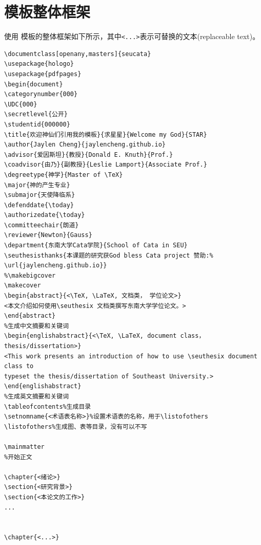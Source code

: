 \documentclass[openany,masters]{seucata}
\begin{document}
\section{模板整体框架}
使用 \seuthesix 模板的整体框架如下所示，其中\verb+<...>+表示可替换的文本(replaceable text)。
{\color{magenta}
\begin{verbatim}
\documentclass[openany,masters]{seucata}
\usepackage{hologo}
\usepackage{pdfpages}
\begin{document}
\categorynumber{000} 
\UDC{000}            
\secretlevel{公开}   
\studentid{000000}   
\title{欢迎神仙们引用我的模板}{求星星}{Welcome my God}{STAR}
\author{Jaylen Cheng}{jaylencheng.github.io}
\advisor{爱因斯坦}{教授}{Donald E. Knuth}{Prof.}
\coadvisor{由乃}{副教授}{Leslie Lamport}{Associate Prof.} 
\degreetype{神学}{Master of \TeX}
\major{神的产生专业}
\submajor{天使降临系}
\defenddate{\today}
\authorizedate{\today}
\committeechair{朗道}
\reviewer{Newton}{Gauss}
\department{东南大学Cata学院}{School of Cata in SEU}
\seuthesisthanks{本课题的研究获God bless Cata project 赞助:%
\url{jaylencheng.github.io}}
%\makebigcover
\makecover
\begin{abstract}{<\TeX, \LaTeX, 文档类， 学位论文>}
<本文介绍如何使用\seuthesix 文档类撰写东南大学学位论文。>
\end{abstract}
%生成中文摘要和关键词
\begin{englishabstract}{<\TeX, \LaTeX, document class， thesis/dissertation>}
<This work presents an introduction of how to use \seuthesix document class to 
typeset the thesis/dissertation of Southeast University.>
\end{englishabstract}
%生成英文摘要和关键词
\tableofcontents%生成目录
\setnomname{<术语表名称>}%设置术语表的名称，用于\listofothers
\listofothers%生成图、表等目录，没有可以不写

\mainmatter
%开始正文

\chapter{<绪论>}
\section{<研究背景>}
\section{<本论文的工作>}
...


\chapter{<...>}

\end{verbatim}}
\end{document}
